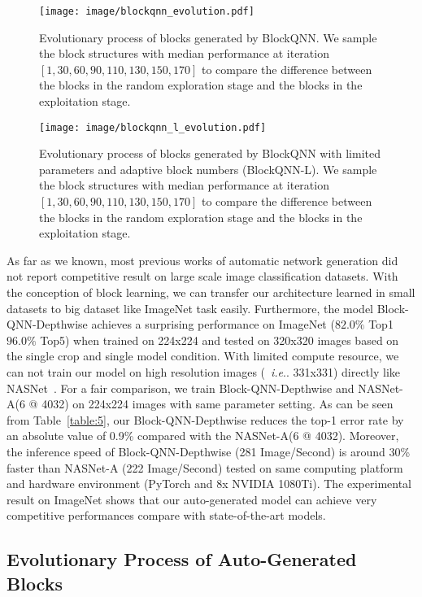 \documentclass[10pt,journal,compsoc]{IEEEtran}
\makeatletter
\DeclareRobustCommand\onedot{\futurelet\@let@token\@onedot}
\def\@onedot{\ifx\@let@token.\else.\null\fi\xspace}
\def\ie{\emph{i.e}\onedot} \def\Ie{\emph{I.e}\onedot}
\makeatother
\begin{document}
\begin{figure*}[tbp]
	\centering
	\texttt{[image: image/blockqnn\_evolution.pdf]}
	\caption{Evolutionary process of blocks generated by BlockQNN. We sample the block structures with median performance at iteration $[1, 30, 60, 90, 110, 130, 150, 170]$ to compare the difference between the blocks in the random exploration stage and the blocks in the exploitation stage.}
	\label{fig:3}
\end{figure*}

\begin{figure*}[tbp]
	\centering
	\texttt{[image: image/blockqnn\_l\_evolution.pdf]}
	\caption{Evolutionary process of blocks generated by BlockQNN with limited parameters and adaptive block numbers (BlockQNN-L). We sample the block structures with median performance at iteration $[1, 30, 60, 90, 110, 130, 150, 170]$ to compare the difference between the blocks in the random exploration stage and the blocks in the exploitation stage.}
	\label{fig:4}
\end{figure*}

As far as we known, most previous works of automatic network generation did not report competitive result on large scale image classification datasets. With the conception of block learning, we can transfer our architecture learned in small datasets to big dataset like ImageNet task easily.
Furthermore, the model Block-QNN-Depthwise achieves a surprising performance on ImageNet ($82.0\%$ Top1 $96.0\%$ Top5) when trained on 224x224 and tested on 320x320 images based on the single crop and single model condition. With limited compute resource, we can not train our model on high resolution images (~\ie 331x331) directly like NASNet~\cite{zoph2018learning}. For a fair comparison, we train Block-QNN-Depthwise and NASNet-A(6 @ 4032) on 224x224 images with same parameter setting. As can be seen from Table~\ref{table:5}, our Block-QNN-Depthwise reduces the top-1 error rate by an absolute value of 0.9\% compared with the NASNet-A(6 @ 4032). Moreover, the inference speed of Block-QNN-Depthwise (281 Image/Second) is around 30\% faster than NASNet-A (222 Image/Second) tested on same computing platform and hardware environment (PyTorch and 8x NVIDIA 1080Ti). The experimental result on ImageNet shows that our auto-generated model can achieve very competitive performances compare with state-of-the-art models.



\subsection{Evolutionary Process of Auto-Generated Blocks}
\end{document}
